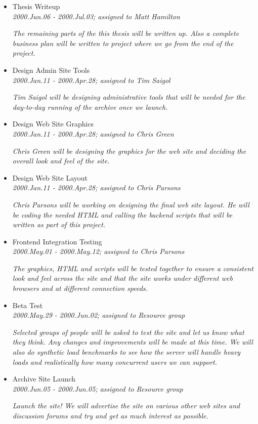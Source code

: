 \begin{itemize}
{\em All of the backend components will be tested together to make sure that they work correctly with each other.}
\item Thesis Writeup\\{\em 2000.Jun.06 - 2000.Jul.03; assigned to Matt Hamilton}

{\em The remaining parts of the this thesis will be written up.  Also a complete business plan will be written to project where we go from the end of the project.}
\item Design Admin Site Tools\\{\em 2000.Jan.11 - 2000.Apr.28; assigned to Tim Saigol}

{\em Tim Saigol will be designing administrative tools that will be needed for the day-to-day running of the archive once we launch.}
\item Design Web Site Graphics\\{\em 2000.Jan.11 - 2000.Apr.28; assigned to Chris Green}

{\em Chris Green will be designing the graphics for the web site and deciding the overall look and feel of the site.}
\item Design Web Site Layout\\{\em 2000.Jan.11 - 2000.Apr.28; assigned to Chris Parsons}

{\em Chris Parsons will be working on designing the final web site layout.  He will be coding the needed HTML and calling the backend scripts that will be written as part of this project.}
\item Frontend Integration Testing\\{\em 2000.May.01 - 2000.May.12; assigned to Chris Parsons}

{\em The graphics, HTML and scripts will be tested together to ensure a consistent look and feel across the site and that the site works under different web browsers and at different connection speeds.}
\item Beta Test\\{\em 2000.May.29 - 2000.Jun.02; assigned to Resource group}

{\em Selected groups of people will be asked to test the site and let us know what they think.  Any changes and improvements will be made at this time.  We will also do synthetic load benchmarks to see how the server will handle heavy loads and realistically how many concurrent users we can support.}
\item Archive Site Launch\\{\em 2000.Jun.05 - 2000.Jun.05; assigned to Resource group}

{\em Launch the site!  We will advertise the site on various other web sites and discussion forums and try and get as much interest as possible.}
\end{itemize}



